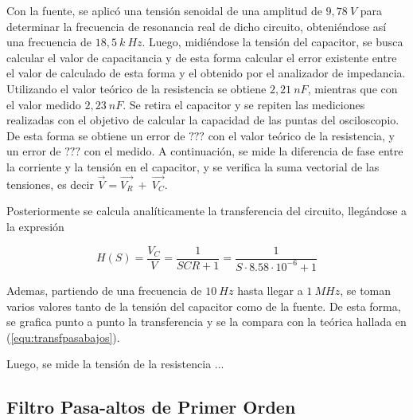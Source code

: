 \documentclass[a4paper]{article}
\begin{document}
Con la fuente, se aplicó una tensión senoidal de una amplitud de $9,78 \ V$ para determinar la frecuencia de resonancia real de dicho circuito, obteniéndose así una frecuencia de $18,5 \ k\ Hz$. Luego, midiéndose la tensión del capacitor, se busca calcular el valor de capacitancia y de esta forma calcular el error existente entre el valor de calculado de esta forma y el obtenido por el analizador de impedancia. Utilizando el valor teórico de la resistencia se obtiene $2,21 \ nF $, mientras que con el valor medido $2,23  \ nF  $. Se retira el capacitor y se repiten las mediciones realizadas con el objetivo de calcular la capacidad de las puntas del osciloscopio. De esta forma se obtiene un error de $ ???  $ con el valor teórico de la resistencia, y un error de $  ???  $ con el medido.
A continuación, se mide la diferencia de fase entre la corriente y la tensión en el capacitor, y se verifica la suma vectorial de las tensiones, es decir $ \overrightarrow{V} = \overrightarrow{V_R} \ + \ \overrightarrow{V_C} $.


Posteriormente se calcula analíticamente la transferencia del circuito, llegándose a la expresión

\begin{equation}
	H \left(S \right) = \frac{V_C}{V} = \frac{1}{SCR + 1} = \frac{1}{S \cdot 8.58 \cdot 10^{-6} + 1}
	\label{equ:transfpasabajos}
\end{equation}

Ademas, partiendo de una frecuencia de $ 10 \ Hz $ hasta llegar a $ 1 \ MHz $, se toman varios valores tanto de la tensión del capacitor como de la fuente. De esta forma, se grafica punto a punto la transferencia y se la compara con la teórica hallada en (\ref{equ:transfpasabajos}).


Luego, se mide la tensión de la resistencia ...

\subsection*{Filtro Pasa-altos de Primer Orden}
\end{document}
